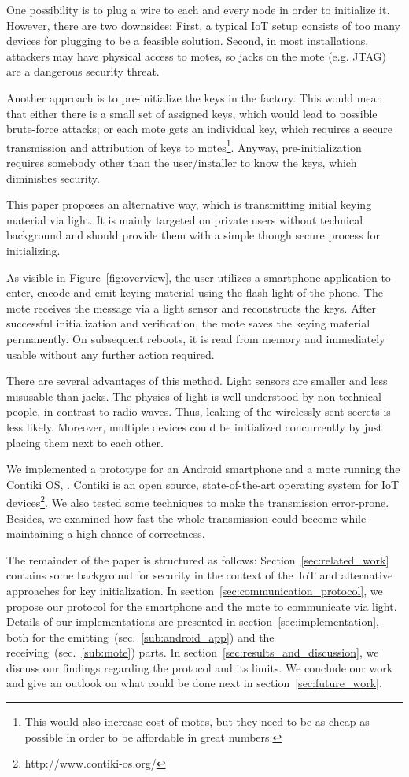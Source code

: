 \documentclass{sig-alternate} %
\begin{document}
One possibility is to plug a wire to each and every node in order to initialize it.
However, there are two downsides: First, a typical IoT setup consists of too many devices for plugging to be a feasible solution. Second, in most installations, attackers may have physical access to motes, so jacks on the mote (e.g. JTAG) are a dangerous security threat.

Another approach is to pre-initialize the keys in the factory.
This would mean that either there is a small set of assigned keys, which would lead to possible brute-force attacks; or each mote gets an individual key, which requires a secure transmission and attribution of keys to motes\footnote{This would also increase cost of motes, but they need to be as cheap as possible in order to be affordable in great numbers.}.
Anyway, pre-initialization requires somebody other than the user/installer to know the keys, which diminishes security.

This paper proposes an alternative way, which is transmitting initial keying material via light.
It is mainly targeted on private users without technical background and should provide them with a simple though secure process for initializing.

As visible in Figure~\ref{fig:overview}, the user utilizes a smartphone application to enter, encode and emit keying material using the flash light of the phone.
The mote receives the message via a light sensor and reconstructs the keys.
After successful initialization and verification, the mote saves the keying material permanently.
On subsequent reboots, it is read from memory and immediately usable without any further action required.

There are several advantages of this method.
Light sensors are smaller and less misusable than jacks.
The physics of light is well understood by non-technical people, in contrast to radio waves.
Thus, leaking of the wirelessly sent secrets is less likely.
Moreover, multiple devices could be initialized concurrently by just placing them next to each other.

We implemented a prototype for an Android smartphone and a mote running the Contiki OS, \cite{dunkels04contiki}.
Contiki is an open source, state-of-the-art operating system for IoT devices\footnote{http://www.contiki-os.org/}.
We also tested some techniques to make the transmission error-prone.
Besides, we examined how fast the whole transmission could become while maintaining a high chance of correctness.

The remainder of the paper is structured as follows:
Section~\ref{sec:related_work} contains some background for security in the context of the~IoT and alternative approaches for key initialization.
In section~\ref{sec:communication_protocol}, we propose our protocol for the smartphone and the mote to communicate via light.
Details of our implementations are presented in section~\ref{sec:implementation}, both for the emitting~(sec.~\ref{sub:android_app}) and the receiving~(sec.~\ref{sub:mote}) parts.
In section~\ref{sec:results_and_discussion}, we discuss our findings regarding the protocol and its limits.
We conclude our work and give an outlook on what could be done next in section~\ref{sec:future_work}.
\end{document}
